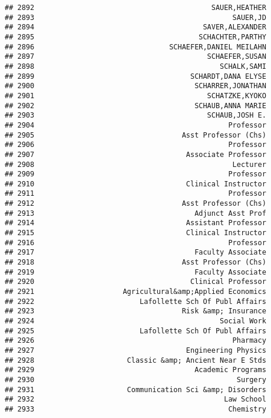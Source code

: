 \documentclass[
]{article}
\begin{document}
\begin{verbatim}
## 2892                                          SAUER,HEATHER
## 2893                                               SAUER,JD
## 2894                                        SAVER,ALEXANDER
## 2895                                       SCHACHTER,PARTHY
## 2896                                SCHAEFER,DANIEL MEILAHN
## 2897                                         SCHAEFER,SUSAN
## 2898                                            SCHALK,SAMI
## 2899                                     SCHARDT,DANA ELYSE
## 2900                                      SCHARRER,JONATHAN
## 2901                                         SCHATZKE,KYOKO
## 2902                                      SCHAUB,ANNA MARIE
## 2903                                         SCHAUB,JOSH E.
## 2904                                              Professor
## 2905                                   Asst Professor (Chs)
## 2906                                              Professor
## 2907                                    Associate Professor
## 2908                                               Lecturer
## 2909                                              Professor
## 2910                                    Clinical Instructor
## 2911                                              Professor
## 2912                                   Asst Professor (Chs)
## 2913                                      Adjunct Asst Prof
## 2914                                    Assistant Professor
## 2915                                    Clinical Instructor
## 2916                                              Professor
## 2917                                      Faculty Associate
## 2918                                   Asst Professor (Chs)
## 2919                                      Faculty Associate
## 2920                                     Clinical Professor
## 2921                     Agricultural&amp;Applied Economics
## 2922                         Lafollette Sch Of Publ Affairs
## 2923                                   Risk &amp; Insurance
## 2924                                            Social Work
## 2925                         Lafollette Sch Of Publ Affairs
## 2926                                               Pharmacy
## 2927                                    Engineering Physics
## 2928                      Classic &amp; Ancient Near E Stds
## 2929                                      Academic Programs
## 2930                                                Surgery
## 2931                      Communication Sci &amp; Disorders
## 2932                                             Law School
## 2933                                              Chemistry

\end{verbatim}
\end{document}

